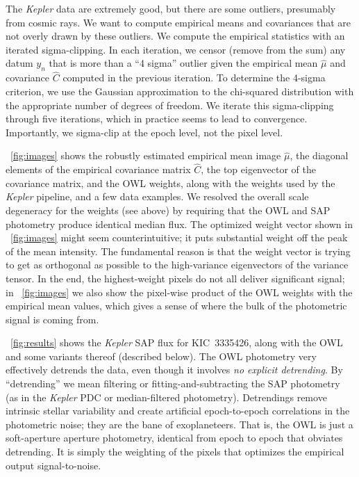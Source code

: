 \documentclass[12pt, letterpaper, preprint]{aastex}
\newcommand{\project}[1]{\textsl{#1}}
\begin{document}
The \project{Kepler} data are extremely good, but there are some outliers,
  presumably from cosmic rays.
We want to compute empirical means and covariances that are not overly drawn by these outliers.
We compute the empirical statistics with an iterated sigma-clipping.
In each iteration, we censor (remove from the sum)
  any datum $y_n$ that is more than a ``4 sigma'' outlier
  given the empirical mean $\hat{\mu}$ and covariance $\hat{C}$ computed in the previous iteration.
To determine the 4-sigma criterion, we use the Gaussian approximation to the chi-squared distribution
  with the appropriate number of degrees of freedom.
We iterate this sigma-clipping through five iterations,
  which in practice seems to lead to convergence.
Importantly, we sigma-clip at the epoch level, not the pixel level.

\figurename~\ref{fig:images} shows the robustly estimated empirical mean image $\hat{\mu}$,
  the diagonal elements of the empirical covariance matrix $\hat{C}$,
  the top eigenvector of the covariance matrix,
  and the OWL weights, along with the weights used by the \project{Kepler} pipeline,
  and a few data examples.
We resolved the overall scale degeneracy for the weights (see above)
  by requiring that the OWL and SAP photometry produce identical median flux.
The optimized weight vector shown in \figurename~\ref{fig:images} might seem counterintuitive;
  it puts substantial weight off the peak of the mean intensity.
The fundamental reason is that the weight vector is trying to get as orthogonal as possible
  to the high-variance eigenvectors of the variance tensor.
In the end, the highest-weight pixels do not all deliver significant signal;
  in \figurename~\ref{fig:images} we also show
  the pixel-wise product of the OWL weights with the empirical mean values,
  which gives a sense of where the bulk of the photometric signal is coming from.

\figurename~\ref{fig:results} shows the \project{Kepler} SAP flux for KIC~3335426,
  along with the OWL and some variants thereof (described below).
The OWL photometry very effectively  detrends the data,
  even though it involves \emph{no explicit detrending}.
By ``detrending'' we mean filtering or fitting-and-subtracting
  the SAP photometry (as in the \project{Kepler} PDC or median-filtered photometry).
Detrendings remove intrinsic stellar variability and create artificial epoch-to-epoch correlations
  in the photometric noise;
  they are the bane of exoplaneteers.
That is, the OWL is just a soft-aperture aperture photometry, identical from epoch to epoch
  that obviates detrending.
It is simply the weighting of the pixels that optimizes the empirical output signal-to-noise.
\end{document}
